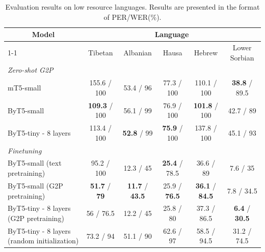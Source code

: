 \documentclass[a4paper]{article}
\begin{document}
\begin{table}[tbh]
\centering
\caption{Evaluation results on low resource languages. Results are presented in the format of PER/WER(\%).}
\begin{tabular}{lccccc}
\hline
\multicolumn{1}{c}{Model} & \multicolumn{5}{c}{Language}                                                                                                   \\ \cline{1-1} \cline{2-6}
      & Tibetan & Albanian & Hausa & Hebrew & Lower Sorbian \\ \hline
\multicolumn{1}{l}{{\it Zero-shot G2P}}   
\\\hline
 mT5-small     &   155.6 / 100     & 53.4 / 96        &    77.3 / 100         & 110.1 / 100            &   \textbf{38.8} / 89.5           \\ 
 ByT5-small     &   \textbf{109.3} / 100     & 56.1 / 99        &    76.9 / 100         & \textbf{101.8} / 100            &   42.7 / 89           \\ 
 ByT5-tiny - 8 layers     &   113.4 / 100     & \textbf{52.8} / 99        &    \textbf{75.9} / 100         & 137.8 / 100            &   45.1 / 93           \\ \hline
\multicolumn{1}{l}{{\it Finetuning}}                                   \\ \hline
 ByT5-small (text pretraining)     &  95.2 / 100          &   12.3 / 45   &          \textbf{25.4} / 78.5          &  36.6 / 89        &   7.6 / 35     \\
 ByT5-small (G2P pretraining)     &   \textbf{51.7} / \textbf{79}          &   \textbf{11.7} / \textbf{43.5}   & 25.9 / \textbf{76.5}          &  \textbf{36.1} / \textbf{84.5}            &     7.8 / 34.5               \\ 
 ByT5-tiny - 8 layers (G2P pretraining)     &   56 / 76.5     &  12.2 / 45    & 25.8 / 80      &  37.3 / 86.5     &     \textbf{6.4} / \textbf{30.5}               \\ 
 ByT5-tiny - 8 layers (random initialization)  & 73.2 / 94  & 51.1 / 90    &    62.6 / 97     &  58.5 / 94.5 &    31.2 / 74.5    \\ \hline
\end{tabular}
\label{tab:zero}
\end{table}
\end{document}
